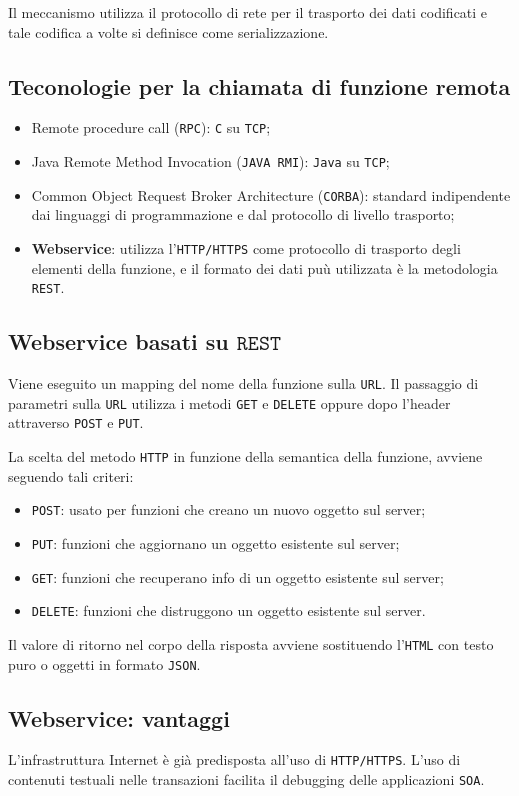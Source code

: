 \documentclass[oneside,a4paper,11pt]{book}
\theoremstyle{italicstyle}
\theoremstyle{normStyle}
\begin{document}
Il meccanismo utilizza il protocollo di rete per il trasporto dei dati 
codificati e tale codifica a volte si definisce come serializzazione.
\subsection{Teconologie per la chiamata di funzione remota}
\begin{itemize}
  \item Remote procedure call (\verb|RPC|): \verb|C| su \verb|TCP|;
  \item Java Remote Method Invocation (\verb|JAVA RMI|): \verb|Java| su \verb|TCP|;
  \item Common Object Request Broker Architecture (\verb|CORBA|):
  standard indipendente dai linguaggi di programmazione e dal protocollo di livello trasporto;
  \item \textbf{Webservice}: utilizza l'\verb|HTTP/HTTPS| come protocollo 
  di trasporto degli elementi della funzione, e il formato dei dati puù utilizzata 
  è la metodologia \verb|REST|.
\end{itemize}
\subsection{Webservice basati su $\texttt{REST}$}
Viene eseguito un mapping del nome della funzione sulla \verb|URL|.
Il passaggio di parametri sulla \verb|URL| utilizza i metodi \verb|GET| e 
\verb|DELETE| oppure dopo l'header attraverso \verb|POST| e \verb|PUT|.

La scelta del metodo \verb|HTTP| in funzione della semantica della funzione, 
avviene seguendo tali criteri:
\begin{itemize}
  \item \verb|POST|: usato per funzioni che creano un nuovo oggetto sul server;
  \item \verb|PUT|: funzioni che aggiornano un oggetto esistente sul server;
  \item \verb|GET|: funzioni che recuperano info di un oggetto esistente sul server;
  \item \verb|DELETE|: funzioni che distruggono un oggetto esistente sul server.
\end{itemize}
Il valore di ritorno nel corpo della risposta avviene sostituendo l'\verb|HTML| con 
testo puro o oggetti in formato \verb|JSON|.
\subsection{Webservice: vantaggi}
L'infrastruttura Internet è già predisposta all'uso di \verb|HTTP/HTTPS|.
L'uso di contenuti testuali nelle transazioni facilita il debugging delle applicazioni 
\verb|SOA|.
\end{document}
